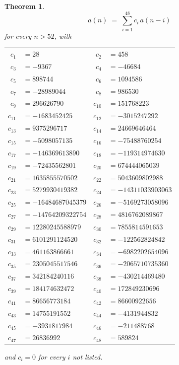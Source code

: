 \documentclass[11pt,a4paper]{article}
\theoremstyle{plain}
\newtheorem{theorem}{Theorem}
\theoremstyle{definition}
\begin{document}
\begin{theorem}
\[
a(n)\;=\;\sum_{i=1}^{48}c_i\,a(n-i)
\]
for every $n>52$, with
\begin{center}\footnotesize
\begin{tabular}{r@{\,}l@{\qquad}r@{\,}l}
$c_{1}$ & $=28$ & $c_{2}$ & $=458$ \\
$c_{3}$ & $=-9367$ & $c_{4}$ & $=-46684$ \\
$c_{5}$ & $=898744$ & $c_{6}$ & $=1094586$ \\
$c_{7}$ & $=-28989044$ & $c_{8}$ & $=986530$ \\
$c_{9}$ & $=296626790$ & $c_{10}$ & $=151768223$ \\
$c_{11}$ & $=-1683452425$ & $c_{12}$ & $=-3015247292$ \\
$c_{13}$ & $=9375296717$ & $c_{14}$ & $=24669646464$ \\
$c_{15}$ & $=-5098057135$ & $c_{16}$ & $=-75488760254$ \\
$c_{17}$ & $=-146369613890$ & $c_{18}$ & $=-119314974630$ \\
$c_{19}$ & $=-72435562801$ & $c_{20}$ & $=674444065039$ \\
$c_{21}$ & $=1635855570502$ & $c_{22}$ & $=5043609802988$ \\
$c_{23}$ & $=5279930419382$ & $c_{24}$ & $=-14311033903063$ \\
$c_{25}$ & $=-16484687045379$ & $c_{26}$ & $=-5169273058096$ \\
$c_{27}$ & $=-14764209322754$ & $c_{28}$ & $=4816762089867$ \\
$c_{29}$ & $=12280245588979$ & $c_{30}$ & $=7855814591653$ \\
$c_{31}$ & $=6101291124520$ & $c_{32}$ & $=-122562824842$ \\
$c_{33}$ & $=461163866661$ & $c_{34}$ & $=-6982202654096$ \\
$c_{35}$ & $=2305045517546$ & $c_{36}$ & $=-2065710735360$ \\
$c_{37}$ & $=342184240116$ & $c_{38}$ & $=-430214469480$ \\
$c_{39}$ & $=184174632472$ & $c_{40}$ & $=172849230696$ \\
$c_{41}$ & $=86656773184$ & $c_{42}$ & $=86600922656$ \\
$c_{43}$ & $=14755191552$ & $c_{44}$ & $=-4131944832$ \\
$c_{45}$ & $=-3931817984$ & $c_{46}$ & $=-211488768$ \\
$c_{47}$ & $=26836992$ & $c_{48}$ & $=589824$ \\
\end{tabular}
\end{center}
and $c_i=0$ for every $i$ not listed.
\end{theorem}
\end{document}
